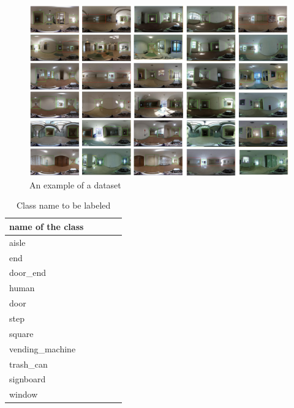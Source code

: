 \documentclass[../main]{subfiles}
\begin{document}
        \begin{figure}[H]
         \centering
         \includegraphics[width=16cm]{../images/dataset_exp.png}
         \caption{An example of a dataset}
         \label{figure::dataset_fig}
        \end{figure}

        \begin{table}
            \caption{Class name to be labeled}
            \centering
            \label{table::datasets_table}
            \begin{tabular}{lllll}
            \hline
            name of the class &  &  &  &  \\ 
            \hline \hline
            aisle             &  &  &  &  \\
            end               &  &  &  &  \\
            door\_end         &  &  &  &  \\
            human             &  &  &  &  \\
            door              &  &  &  &  \\
            step              &  &  &  &  \\
            square            &  &  &  &  \\
            vending\_machine  &  &  &  &  \\
            trash\_can        &  &  &  &  \\
            signboard         &  &  &  &  \\
            window            &  &  &  &  \\ 
            \hline
            \end{tabular}
        \end{table}     
\end{document}
